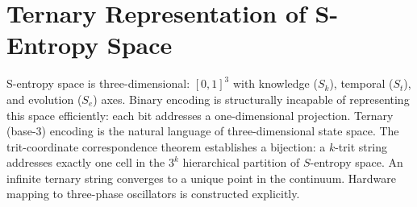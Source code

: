 \chapter{Ternary Representation of S-Entropy Space}
\label{ch:ternary}


\begin{chapterabstract}
S-entropy space is three-dimensional: $[0,1]^3$ with knowledge ($S_k$), temporal ($S_t$), and evolution ($S_e$) axes. Binary encoding is structurally incapable of representing this space efficiently: each bit addresses a one-dimensional projection. Ternary (base-3) encoding is the natural language of three-dimensional state space. The trit-coordinate correspondence theorem establishes a bijection: a $k$-trit string addresses exactly one cell in the $3^k$ hierarchical partition of $S$-entropy space. An infinite ternary string converges to a unique point in the continuum. Hardware mapping to three-phase oscillators is constructed explicitly.
\end{chapterabstract}


